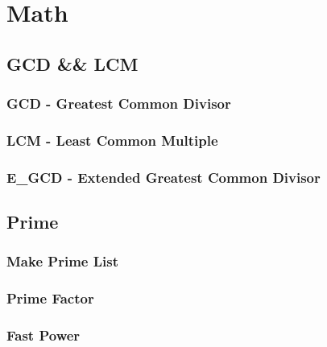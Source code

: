 \section{Math}
	\subsection{GCD \&\& LCM}
		\subsubsection{GCD - Greatest Common Divisor}
			
		\subsubsection{LCM - Least Common Multiple}
			
		\subsubsection{E\_GCD - Extended Greatest Common Divisor}
			
	\subsection{Prime}
		\subsubsection{Make Prime List}
			
		\subsubsection{Prime Factor}
			
		\subsubsection{Fast Power}
			
